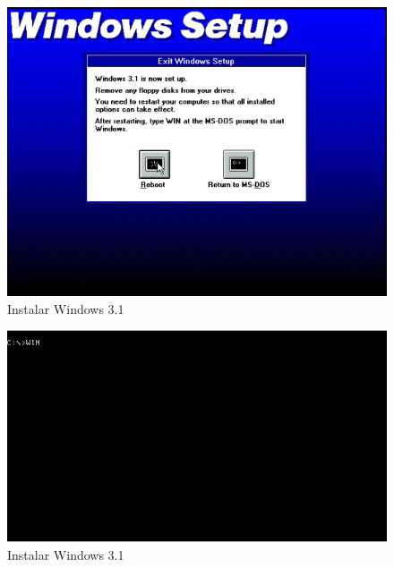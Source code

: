 \documentclass{report}
\begin{document}
\begin{figure}
\centering
\includegraphics[width=\textwidth]{Screenshot_36.png}
\caption{Instalar Windows 3.1}
\label{fig:36}
\end{figure}

\begin{figure}
\centering
\includegraphics[width=\textwidth]{Screenshot_37.png}
\caption{Instalar Windows 3.1}
\label{fig:37}
\end{figure}
\end{document}
